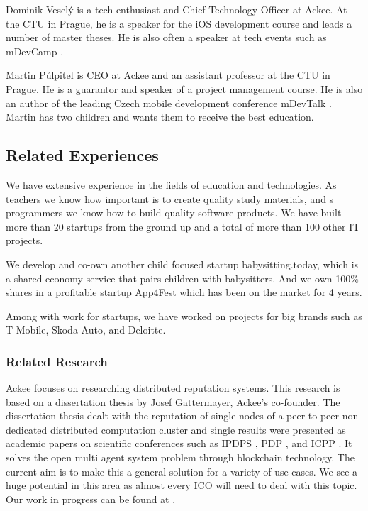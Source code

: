\documentclass[english]{article}
\begin{document}
Dominik Veselý is a tech enthusiast and Chief Technology Officer at Ackee. At the CTU in Prague, he is a speaker for the  iOS development course and leads a number of master theses. He is also often a speaker at tech events such as mDevCamp \cite{mdevcamp}.

Martin Půlpitel is CEO at Ackee and an assistant professor at the CTU in Prague. He is a 
guarantor and speaker of a project management course. He is also an author of the leading Czech mobile development conference mDevTalk \cite{mdevtalk}. Martin has two children and wants them to receive the best education.

\subsection{Related Experiences}
We have extensive experience in the fields of education and technologies. As teachers we know how important is to create quality study materials, and s programmers we know how to build quality software products. We have built more than 20 startups from the ground up and a total of more than 100 other IT projects. 

We develop and co-own another child focused startup babysitting.today, which is a shared economy service that pairs children with babysitters. And we own 100\% shares in a profitable startup App4Fest which has been on the market for 4 years.

Among with work for startups, we have worked on projects for big brands such as T-Mobile, Skoda Auto, and Deloitte. 

\subsubsection{Related Research}
Ackee focuses on researching distributed reputation systems. This research is based on a dissertation thesis by Josef Gattermayer, Ackee’s co-founder. The dissertation thesis dealt with the reputation of single nodes of a peer-to-peer non-dedicated distributed computation cluster and single results were presented as academic papers on scientific conferences such as IPDPS \cite{ipdps}, PDP \cite{pdp}, and ICPP \cite{icpp}. It solves the open multi agent system problem \cite{multiagent} through blockchain technology. The current aim is to make this a general solution for a variety of use cases. We see a huge potential in this area as almost every ICO will need to deal with this topic. Our work in progress can be found at \cite{ackeenetwork}.
\end{document}
